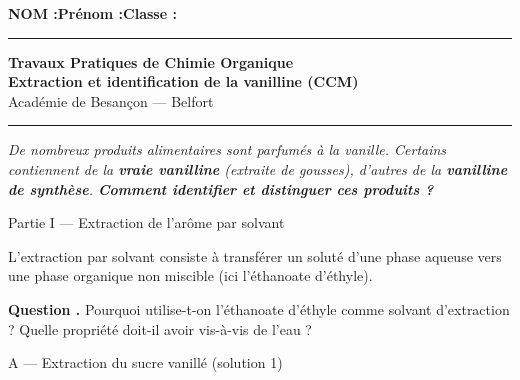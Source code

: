 \documentclass[11pt,a4paper]{article}
\newcommand{\sectitle}[1]{%
  \vspace{6pt}
  \noindent\colorbox{exoheader}{\parbox{\dimexpr\linewidth-2\fboxsep}%
    {\color{white}\bfseries\large\strut\quad #1}}
  \vspace{4pt}
}
\newcommand{\subsectitle}[1]{%
  \vspace{4pt}
  \noindent\colorbox{exolight}{\parbox{\dimexpr\linewidth-2\fboxsep}%
    {\color{exoheader}\bfseries\strut\quad #1}}
  \vspace{2pt}
}
\newcounter{question}
\newcommand{\question}{%
  \stepcounter{question}%
  \noindent\textcolor{exoheader}{\textbf{Question \thequestion.}}\quad
}
\begin{document}
\noindent\textbf{NOM :}\hfill\textbf{Prénom :}\hfill\textbf{Classe :}\hfill\phantom{x}\\[0.2cm]
\hrule\vspace{0.2cm}

\begin{center}
  {\large\bfseries\textcolor{exoheader}{Travaux Pratiques de Chimie Organique}}\\[4pt]
  {\LARGE\bfseries Extraction et identification de la vanilline (CCM)}\\[2pt]
  {\small Académie de Besançon --- Belfort}
\end{center}
\hrule\vspace{6pt}

\begin{tcolorbox}[enhanced, colback=problemebg, colframe=exoheader, boxrule=1.5pt,
  title={\faFlask\quad Problématique},
  fonttitle=\bfseries\color{white},
  attach boxed title to top left={yshift=-2mm, xshift=4mm},
  boxed title style={colback=exoheader, colframe=exoheader}]
\textit{De nombreux produits alimentaires sont parfumés à la vanille.
Certains contiennent de la \textbf{vraie vanilline} (extraite de gousses), d'autres de la
\textbf{vanilline de synthèse}. \textbf{Comment identifier et distinguer ces produits ?}}
\end{tcolorbox}

\vspace{6pt}

\sectitle{Partie I --- Extraction de l'arôme par solvant}

\begin{mdframed}[backgroundcolor=exolight, linecolor=exoheader, linewidth=1.2pt]
L'extraction par solvant consiste à transférer un soluté d'une phase aqueuse vers
une phase organique non miscible (ici l'éthanoate d'éthyle).
\end{mdframed}

\vspace{4pt}
\question Pourquoi utilise-t-on l'éthanoate d'éthyle comme solvant d'extraction ?
Quelle propriété doit-il avoir vis-à-vis de l'eau ? \dotfill

\vspace{0.3cm}\noindent\dotfill

\vspace{4pt}
\subsectitle{A --- Extraction du sucre vanillé (solution 1)}
\end{document}
